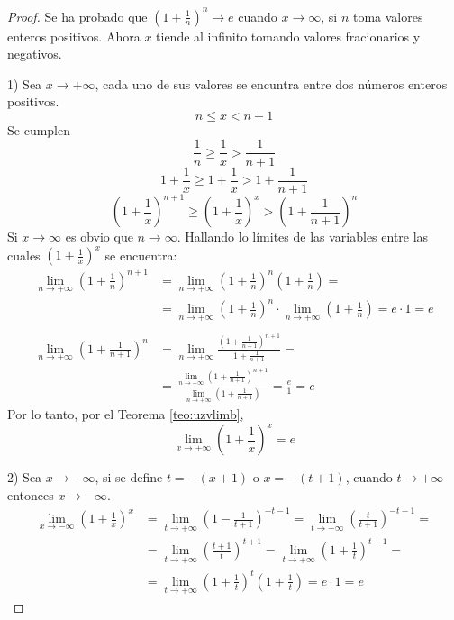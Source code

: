\begin{proof}
  Se ha probado que \( \left( 1 + \frac{1}{n} \right)^n \to e \) cuando \( x \to \infty \), si \(n\) toma valores enteros positivos. Ahora \(x\) tiende al infinito tomando valores fracionarios y negativos.

  1) Sea \( x \to +\infty \), cada uno de sus valores se encuntra entre dos números enteros positivos.
  \[ n \le x < n + 1 \]
  Se cumplen
  \[ \frac{1}{n} \ge \frac{1}{x} > \frac{1}{n + 1} \]
  \[ 1 + \frac{1}{x} \ge 1 + \frac{1}{x} > 1 + \frac{1}{n + 1} \]
  \[ \left( 1 + \frac{1}{x} \right)^{n + 1} \ge \left( 1 + \frac{1}{x} \right)^{x} > \left( 1 + \frac{1}{n + 1} \right)^{n} \]
  Si \( x \to \infty \) es obvio que \( n \to \infty \). Hallando lo límites de las variables entre las cuales \( \left( 1 + \frac{1}{x} \right)^x \) se encuentra:
  \begin{align*}
    \lim_{n \to +\infty} \left( 1 + \frac{1}{n} \right)^{n + 1} & =
    \lim_{n \to +\infty} \left( 1 + \frac{1}{n} \right)^n
      \left( 1 + \frac{1}{n} \right) =
    \\ & =
    \lim_{n \to +\infty} \left( 1 + \frac{1}{n} \right)^n \cdot
      \lim_{n \to +\infty} \left( 1 + \frac{1}{n} \right)
    = e \cdot 1 = e
    \\
    \\
    \lim_{n \to +\infty} \left( 1 + \frac{1}{n + 1} \right)^{n} & =
    \lim_{n \to +\infty}
      \frac {\left( 1 + \frac{1}{n + 1} \right)^{n + 1}}
            {1 + \frac{1}{n + 1}} =
    \\ & =
    \frac {\lim_{n \to +\infty} \left( 1 + \frac{1}{n + 1} \right)^{n + 1}}
          {\lim_{n \to +\infty} \left( 1 + \frac{1}{n + 1} \right) }
    = \frac{e}{1} = e
  \end{align*}
  Por lo tanto, por el Teorema \ref{teo:uzvlimb},
  \[ \lim_{x \to +\infty} \left( 1 + \frac{1}{x} \right)^x = e \]

  2) Sea \( x \to -\infty \), si se define \( t = - (x + 1) \) o \( x = -(t + 1) \), cuando \( t \to +\infty \) entonces \( x \to -\infty \).
  \begin{align*}
   \lim_{x \to -\infty} \left( 1 + \frac{1}{x} \right)^x & = \lim_{t \to +\infty} \left( 1 - \frac{1}{t + 1} \right)^{-t-1} = \lim_{t \to +\infty} \left( \frac{t}{t + 1} \right)^{-t-1} = \\
   & = \lim_{t \to +\infty} \left( \frac{t + 1}{t} \right)^{t + 1} = \lim_{t \to +\infty} \left( 1 + \frac{1}{t} \right)^{t + 1} = \\
   & = \lim_{t \to +\infty} \left( 1 + \frac{1}{t} \right)^t \left( 1 + \frac{1}{t} \right) = e \cdot 1 = e
  \end{align*}
\end{proof}


